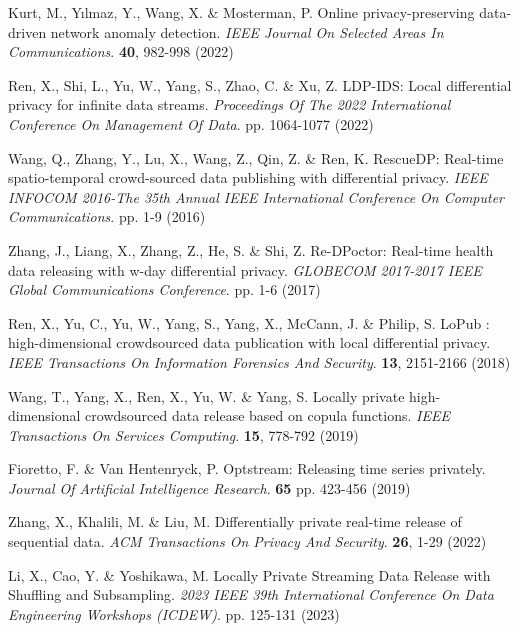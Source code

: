 \begin{thebibliography}{10}
\begin{small}
Kurt, M., Yılmaz, Y., Wang, X. \& Mosterman, P. Online privacy-preserving data-driven network anomaly detection. {\em IEEE Journal On Selected Areas In Communications}. \textbf{40}, 982-998 (2022)



Ren, X., Shi, L., Yu, W., Yang, S., Zhao, C. \& Xu, Z. LDP-IDS: Local differential privacy for infinite data streams. {\em Proceedings Of The 2022 International Conference On Management Of Data}. pp. 1064-1077 (2022)

Wang, Q., Zhang, Y., Lu, X., Wang, Z., Qin, Z. \& Ren, K. RescueDP: Real-time spatio-temporal crowd-sourced data publishing with differential privacy. {\em IEEE INFOCOM 2016-The 35th Annual IEEE International Conference On Computer Communications}. pp. 1-9 (2016)

Zhang, J., Liang, X., Zhang, Z., He, S. \& Shi, Z. Re-DPoctor: Real-time health data releasing with w-day differential privacy. {\em GLOBECOM 2017-2017 IEEE Global Communications Conference}. pp. 1-6 (2017)


Ren, X., Yu, C., Yu, W., Yang, S., Yang, X., McCann, J. \& Philip, S.  {LoPub} : high-dimensional crowdsourced data publication with local differential privacy. {\em IEEE Transactions On Information Forensics And Security}. \textbf{13}, 2151-2166 (2018)

Wang, T., Yang, X., Ren, X., Yu, W. \& Yang, S. Locally private high-dimensional crowdsourced data release based on copula functions. {\em IEEE Transactions On Services Computing}. \textbf{15}, 778-792 (2019)

Fioretto, F. \& Van Hentenryck, P. Optstream: Releasing time series privately. {\em Journal Of Artificial Intelligence Research}. \textbf{65} pp. 423-456 (2019)

Zhang, X., Khalili, M. \& Liu, M. Differentially private real-time release of sequential data. {\em ACM Transactions On Privacy And Security}. \textbf{26}, 1-29 (2022)

Li, X., Cao, Y. \& Yoshikawa, M. Locally Private Streaming Data Release with Shuffling and Subsampling. {\em 2023 IEEE 39th International Conference On Data Engineering Workshops (ICDEW)}. pp. 125-131 (2023)


\end{small}
\end{thebibliography}
